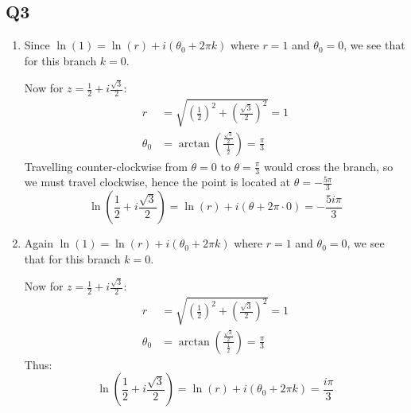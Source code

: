 \documentclass[a4paper, 11pt]{article}
\begin{document}
\begin{multicols}{2}
	\pagebreak
	\section*{Q3}
	\begin{enumerate}[label=(\alph*)]
		\item
		      Since $\ln(1)=\ln(r)+i(\theta_0 +2\pi k)$ where $r=1$ and $\theta_0=0$, we see that for this branch $k=0$.

		      Now for $z=\frac 12 + i\frac{\sqrt3}2$:
		      \begin{align*}
			      r        & =\sqrt{\left( \frac 12 \right)^2 + \left( \frac{\sqrt 3}{2} \right)^2}=1     \\
			      \theta_0 & = \arctan \left( \frac{\frac{\sqrt 3}{2}}{\frac 12}  \right) = \frac{\pi}{3}
		      \end{align*}
		      Travelling counter-clockwise from $\theta=0$ to $\theta=\frac\pi3$ would cross the branch, so we must travel clockwise, hence the point is located at $\theta=-\frac{5\pi}3$
		      $$
			      \ln\left( \frac 12 + i\frac{\sqrt3}2 \right)  = \ln(r) + i(\theta+2\pi \cdot 0) = -\frac{5i\pi}3
		      $$

		\item
		      Again $\ln(1)=\ln(r)+i(\theta_0 +2\pi k)$ where $r=1$ and $\theta_0=0$, we see that for this branch $k=0$.

		      Now for $z=\frac 12 + i\frac{\sqrt3}2$:
		      \begin{align*}
			      r        & =\sqrt{\left( \frac 12 \right)^2 + \left( \frac{\sqrt 3}{2} \right)^2}=1     \\
			      \theta_0 & = \arctan \left( \frac{\frac{\sqrt 3}{2}}{\frac 12}  \right) = \frac{\pi}{3}
		      \end{align*}
		      Thus:
		      $$
			      \ln\left( \frac 12 + i\frac{\sqrt3}2 \right)  = \ln(r) + i(\theta_0 +2\pi k) = \frac{i\pi}3
		      $$


	\end{enumerate}
\end{multicols}
\end{document}
